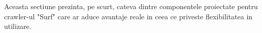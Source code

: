 Aceasta sectiune prezinta, pe scurt, cateva dintre componentele proiectate pentru crawler-ul "Surf" care ar aduce avantaje reale in ceea ce priveste flexibilitatea in utilizare.